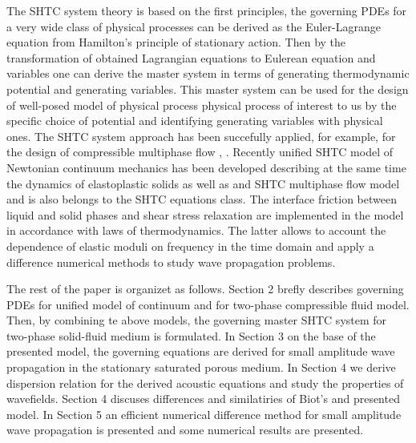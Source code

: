 \documentclass[3p,times]{elsarticle}
\begin{document}
The SHTC system theory is based on the first principles, the governing PDEs for a very wide class of physical processes can be derived as the Euler-Lagrange equation from Hamilton’s principle
of stationary action. Then by the transformation of obtained Lagrangian equations to Eulerean equation and variables one can derive the master system in terms of generating thermodynamic potential and generating variables. This master system can be used for the design of well-posed model of physical process physical process of interest to us by the specific choice of potential and identifying generating variables with physical ones. The SHTC system approach has been succefully applied, for example, for the design of compressible multiphase flow  \cite{}, \cite{}. 
Recently unified SHTC model of Newtonian continuum mechanics has been developed describing at the same time the dynamics of elastoplastic solids as well as and SHTC multiphase flow model and is also belongs to the SHTC equations class. The interface friction between liquid and solid phases and shear stress relaxation are implemented in the model in accordance with laws of thermodynamics. The latter allows to account the dependence of elastic moduli on frequency in the time domain and apply a difference numerical methods to study wave propagation problems.  

The rest of the paper is organizet as follows. Section 2 brefly describes governing PDEs for unified model of continuum and for two-phase compressible fluid model. Then, by combining te above models, the governing master SHTC system for two-phase solid-fluid medium is formulated.
In Section 3 on the base of the presented model, the governing equations are derived for small amplitude wave propagation in the stationary saturated porous medium. In Section 4 we derive dispersion relation for the derived acoustic equations and study the properties of wavefields. Section 4 discuses differences and similatiries of Biot's and presented model.
In Section 5 an efficient numerical difference method for small amplitude wave propagation is presented and some numerical results are presented.         




%
\end{document}
